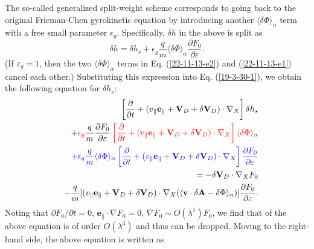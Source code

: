 \documentclass{llncs}
\newcommand{\tmcolor}[2]{{\color{#1}{#2}}}
\begin{document}
The so-called generalized split-weight scheme corresponds to going back to the
original Frieman-Chen gyrokinetic equation by introducing another $\langle
\delta \Phi \rangle_{\alpha}$ term with a free small parameter $\epsilon_g$.
Specifically, $\delta h$ in the above is split as
\begin{equation}
  \label{22-11-13-e1} \delta h = \delta h_s + \epsilon_g \frac{q}{m} \langle
  \delta \Phi \rangle_{\alpha} \frac{\partial F_0}{\partial \varepsilon} .
\end{equation}
(If $\varepsilon_g = 1$, then the two $\langle \delta \Phi \rangle_{\alpha}$
terms in Eq. (\ref{22-11-13-e2}) and (\ref{22-11-13-e1}) cancel each other.)
Substituting this expression into Eq. (\ref{19-3-30-1}), we obtain the
following equation for $\delta h_s$:
\begin{eqnarray}
  &  & \left[ \frac{\partial}{\partial t} + (v_{\parallel}
  \mathbf{e}_{\parallel} +\mathbf{V}_D + \delta \mathbf{V}_D) \cdot \nabla_X
  \right] \delta h_s \nonumber\\
  &  & + \tmcolor{red}{\epsilon_g \tmcolor{black}{\frac{q}{m} \frac{\partial
  F_0}{\partial \varepsilon}} \left[ \frac{\partial}{\partial t} +
  (v_{\parallel} \mathbf{e}_{\parallel} +\mathbf{V}_D + \delta \mathbf{V}_D)
  \cdot \nabla_X \right] \langle \delta \Phi \rangle_{\alpha}} \nonumber\\
  &  & \tmcolor{blue}{+ \epsilon_g \frac{q}{m} \langle \delta \Phi
  \rangle_{\alpha} \left[ \frac{\partial}{\partial t} + (v_{\parallel}
  \mathbf{e}_{\parallel} +\mathbf{V}_D + \delta \mathbf{V}_D) \cdot \nabla_X
  \right] \frac{\partial F_0}{\partial \varepsilon}} \nonumber\\
  &  & = - \delta \mathbf{V}_D \cdot \nabla_X F_0 \nonumber\\
  &  & - \frac{q}{m} [(v_{\parallel} \mathbf{e}_{\parallel} +\mathbf{V}_D +
  \delta \mathbf{V}_D) \cdot \nabla_X (\langle \mathbf{v} \cdot \delta
  \mathbf{A}- \delta \Phi \rangle_{\alpha})] \frac{\partial F_0}{\partial
  \varepsilon} .  \label{19-1-10-7m}
\end{eqnarray}
Noting that $\partial F_0 / \partial t = 0$, $\mathbf{e}_{\parallel} \cdot
\nabla F_0 = 0$, $\nabla F_0 \sim O (\lambda^1) F_0$, we find that
\tmcolor{blue}{the third line} of the above equation is of order $O
(\lambda^3)$ and thus can be dropped. Moving \tmcolor{red}{the second line} to
the right-hand side, the above equation is written as
\end{document}
